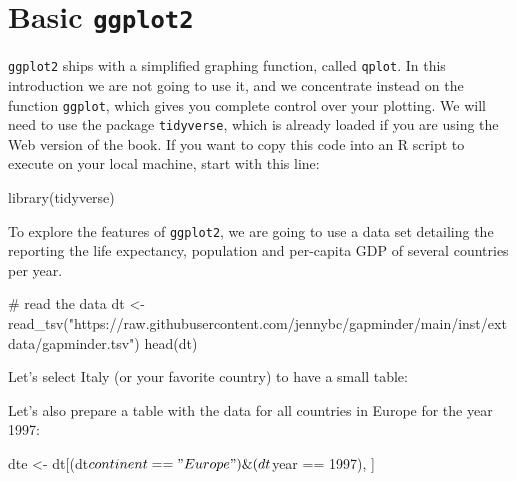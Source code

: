 \documentclass[
  letterpaper,
  DIV=11,
  numbers=noendperiod]{scrreprt}
\newenvironment{Shaded}{\begin{snugshade}}{\end{snugshade}}
\newcommand{\NormalTok}[1]{\textcolor[rgb]{0.00,0.23,0.31}{#1}}
\begin{document}
\section{\texorpdfstring{Basic
\texttt{ggplot2}}{Basic ggplot2}}\label{basic-ggplot2}

\texttt{ggplot2} ships with a simplified graphing function, called
\texttt{qplot}. In this introduction we are not going to use it, and we
concentrate instead on the function \texttt{ggplot}, which gives you
complete control over your plotting. We will need to use the package
\texttt{tidyverse}, which is already loaded if you are using the Web
version of the book. If you want to copy this code into an R script to
execute on your local machine, start with this line:

\begin{Shaded}
\begin{Highlighting}[]
\NormalTok{library(tidyverse)}
\end{Highlighting}
\end{Shaded}

To explore the features of \texttt{ggplot2}, we are going to use a data
set detailing the reporting the life expectancy, population and
per-capita GDP of several countries per year.

\begin{Shaded}
\begin{Highlighting}[]
\NormalTok{\# read the data}
\NormalTok{dt \textless{}{-} read\_tsv("https://raw.githubusercontent.com/jennybc/gapminder/main/inst/extdata/gapminder.tsv")}
\NormalTok{head(dt)}
\end{Highlighting}
\end{Shaded}

Let's select Italy (or your favorite country) to have a small table:

\begin{Shaded}
\end{Shaded}

Let's also prepare a table with the data for all countries in Europe for
the year 1997:

\begin{Shaded}
\begin{Highlighting}[]
\NormalTok{dte \textless{}{-} dt[(dt$continent == "Europe") \& (dt$year == 1997), ]}
\end{Highlighting}
\end{Shaded}
\end{document}
